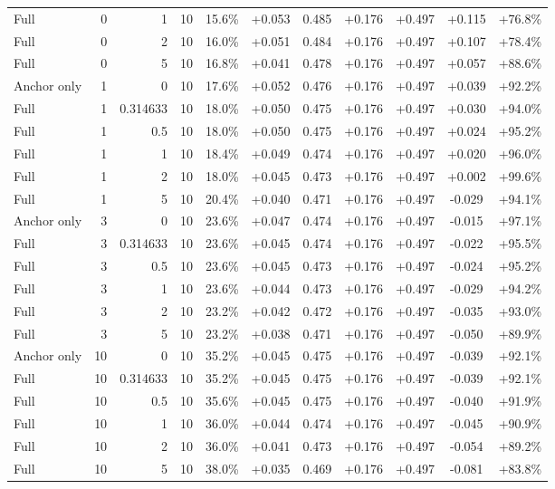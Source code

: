 \begin{table}[htbp]
\begin{tabular}{lrrrccccccc}
Full & 0 & 1 & 10 & 15.6\% & +0.053 & 0.485 & +0.176 & +0.497 & +0.115 & +76.8\% \\
Full & 0 & 2 & 10 & 16.0\% & +0.051 & 0.484 & +0.176 & +0.497 & +0.107 & +78.4\% \\
Full & 0 & 5 & 10 & 16.8\% & +0.041 & 0.478 & +0.176 & +0.497 & +0.057 & +88.6\% \\
Anchor only & 1 & 0 & 10 & 17.6\% & +0.052 & 0.476 & +0.176 & +0.497 & +0.039 & +92.2\% \\
Full & 1 & 0.314633 & 10 & 18.0\% & +0.050 & 0.475 & +0.176 & +0.497 & +0.030 & +94.0\% \\
Full & 1 & 0.5 & 10 & 18.0\% & +0.050 & 0.475 & +0.176 & +0.497 & +0.024 & +95.2\% \\
Full & 1 & 1 & 10 & 18.4\% & +0.049 & 0.474 & +0.176 & +0.497 & +0.020 & +96.0\% \\
Full & 1 & 2 & 10 & 18.0\% & +0.045 & 0.473 & +0.176 & +0.497 & +0.002 & +99.6\% \\
Full & 1 & 5 & 10 & 20.4\% & +0.040 & 0.471 & +0.176 & +0.497 & -0.029 & +94.1\% \\
Anchor only & 3 & 0 & 10 & 23.6\% & +0.047 & 0.474 & +0.176 & +0.497 & -0.015 & +97.1\% \\
Full & 3 & 0.314633 & 10 & 23.6\% & +0.045 & 0.474 & +0.176 & +0.497 & -0.022 & +95.5\% \\
Full & 3 & 0.5 & 10 & 23.6\% & +0.045 & 0.473 & +0.176 & +0.497 & -0.024 & +95.2\% \\
Full & 3 & 1 & 10 & 23.6\% & +0.044 & 0.473 & +0.176 & +0.497 & -0.029 & +94.2\% \\
Full & 3 & 2 & 10 & 23.2\% & +0.042 & 0.472 & +0.176 & +0.497 & -0.035 & +93.0\% \\
Full & 3 & 5 & 10 & 23.2\% & +0.038 & 0.471 & +0.176 & +0.497 & -0.050 & +89.9\% \\
Anchor only & 10 & 0 & 10 & 35.2\% & +0.045 & 0.475 & +0.176 & +0.497 & -0.039 & +92.1\% \\
Full & 10 & 0.314633 & 10 & 35.2\% & +0.045 & 0.475 & +0.176 & +0.497 & -0.039 & +92.1\% \\
Full & 10 & 0.5 & 10 & 35.6\% & +0.045 & 0.475 & +0.176 & +0.497 & -0.040 & +91.9\% \\
Full & 10 & 1 & 10 & 36.0\% & +0.044 & 0.474 & +0.176 & +0.497 & -0.045 & +90.9\% \\
Full & 10 & 2 & 10 & 36.0\% & +0.041 & 0.473 & +0.176 & +0.497 & -0.054 & +89.2\% \\
Full & 10 & 5 & 10 & 38.0\% & +0.035 & 0.469 & +0.176 & +0.497 & -0.081 & +83.8\% \\

\end{tabular}
\end{table}
